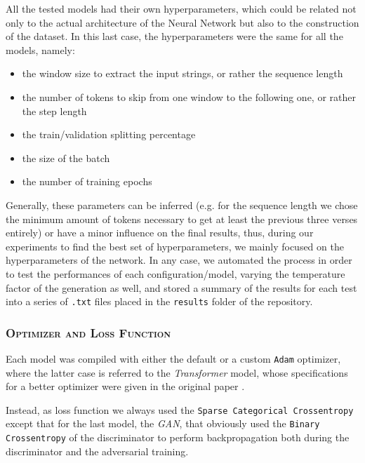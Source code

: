 All the tested models had their own hyperparameters, which could be related not only to the actual architecture of the Neural Network but also to the construction of the dataset.
In this last case, the hyperparameters were the same for all the models, namely:
\begin{itemize}
    \item the window size to extract the input strings, or rather the sequence length
    \item the number of tokens to skip from one window to the following one, or rather the step length
    \item the train/validation splitting percentage
    \item the size of the batch
    \item the number of training epochs
\end{itemize}

Generally, these parameters can be inferred (e.g. for the sequence length we chose the minimum amount of tokens necessary to get at least the previous three verses entirely) or have a minor influence on the final results, thus, during our experiments to find the best set of hyperparameters, we mainly focused on the hyperparameters of the network.
In any case, we automated the process in order to test the performances of each configuration/model, varying the temperature factor of the generation as well, and stored a summary of the results for each test into a series of \texttt{.txt} files placed in the \texttt{results} folder of the repository.

\subsubsection{\textsc{Optimizer and Loss Function}}

Each model was compiled with either the default or a custom \texttt{Adam} optimizer, where the latter case is referred to the \textit{Transformer} model, whose specifications for a better optimizer were given in the original paper \parencite{vaswani2017attention}.

Instead, as loss function we always used the \texttt{Sparse Categorical Crossentropy} except that for the last model, the \textit{GAN}, that obviously used the \texttt{Binary Crossentropy} of the discriminator to perform backpropagation both during the discriminator and the adversarial training.











